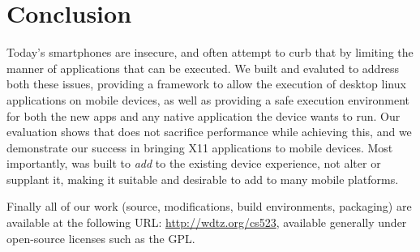 \section{Conclusion}
\label{sec:conclusion}
Today's smartphones are insecure, and often attempt to curb that by limiting the manner of applications that can be executed.  We built and evaluted \emph{\proj} to address both these issues, providing a framework to allow the execution of desktop linux applications on mobile devices, as well as providing a safe execution environment for both the new apps and any native application the device wants to run.  Our evaluation shows that \emph{\proj} does not sacrifice performance while achieving this, and we demonstrate our success in bringing X11 applications to mobile devices.  Most importantly, \emph{\proj} was built to \emph{add} to the existing device experience, not alter or supplant it, making it suitable and desirable to add to many mobile platforms.

Finally all of our work (source, modifications, build environments, packaging) are available at the following URL: \url{http://wdtz.org/cs523}, available generally under open-source licenses such as the GPL.
